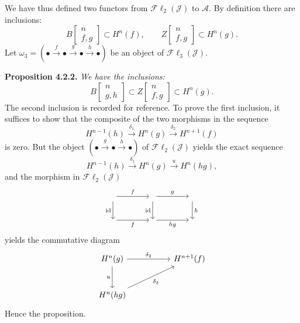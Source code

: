 \clearpage
{}%
\begingroup\small\setlength{\parskip}{0pt}\setlength{\emergencystretch}{1.5em}
We have thus defined two functors from $\mathcal{F}\ell_2(\mathcal J)$ to
$\mathcal A$. By definition there are inclusions:
\[
B\!\left[\begin{smallmatrix}n\\f,g\end{smallmatrix}\right]\subset H^n(f),
\qquad
Z\!\left[\begin{smallmatrix}n\\f,g\end{smallmatrix}\right]\subset H^n(g).
\]
Let
$\omega_3=(\mathord\bullet\xrightarrow f\mathord\bullet\xrightarrow g
\mathord\bullet\xrightarrow h\mathord\bullet)$ be an object of
$\mathcal{F}\ell_3(\mathcal J)$.

\medskip\noindent\textbf{Proposition 4.2.2.}\quad
\textit{We have the inclusions:}
\[
B\!\left[\begin{smallmatrix}n\\g,h\end{smallmatrix}\right]
\subset
Z\!\left[\begin{smallmatrix}n\\f,g\end{smallmatrix}\right]
\subset H^n(g).
\]
The second inclusion is recorded for reference. To prove the first inclusion,
it suffices to show that the composite of the two morphisms in the sequence
\[
H^{n-1}(h)\xrightarrow{\delta_1}H^n(g)
\xrightarrow{\delta_2}H^{n+1}(f)
\]
is zero. But the object
$(\mathord\bullet\xrightarrow g\mathord\bullet\xrightarrow h\mathord\bullet)$
of $\mathcal{F}\ell_2(\mathcal J)$ yields the exact sequence
\[
H^{n-1}(h)\xrightarrow{\delta_1}H^n(g)
\xrightarrow u H^n(hg),
\]
and the morphism in $\mathcal{F}\ell_2(\mathcal J)$
\[
\begin{tikzcd}[column sep=4em,row sep=2.2em]
{}\arrow[r,"f"]\arrow[d,"\operatorname{id}"']&{}
 \arrow[r,"g"]\arrow[d,"\operatorname{id}"']&{}\arrow[d,"h"]\\
{}\arrow[r,"f"']&{}\arrow[r,"hg"']&{}
\end{tikzcd}
\]
yields the commutative diagram
\[
\begin{tikzcd}[column sep=5em,row sep=2.7em]
H^n(g)\arrow[r,"\delta_2"]\arrow[d,"u"']&H^{n+1}(f)\\
H^n(hg)\arrow[ur,"\delta_3"']&{}
\end{tikzcd}
\]
Hence the proposition.
\endgroup
